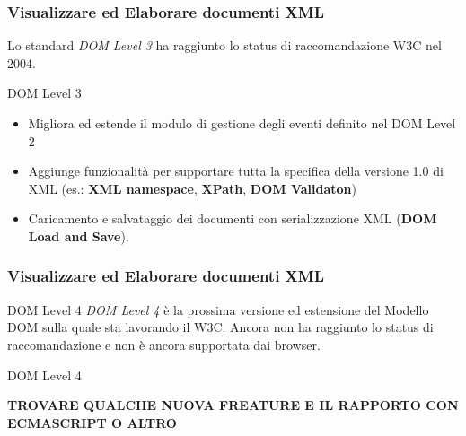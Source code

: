 \begin{frame}
    \frametitle{Visualizzare ed Elaborare documenti XML}
    \addtocounter{nframe}{1}
    

     
      Lo standard \textit{DOM Level 3} ha raggiunto lo status di raccomandazione W3C nel 2004.
     

     \begin{block}{DOM Level 3}
        \begin{itemize}
            \item Migliora ed estende il modulo di gestione degli eventi definito nel DOM Level 2
            \item Aggiunge funzionalità per supportare tutta la specifica della versione 1.0 di XML (es.: \textbf{XML namespace}, \textbf{XPath}, \textbf{DOM Validaton})
            \item Caricamento e salvataggio dei documenti con serializzazione XML (\textbf{DOM Load and Save}).
        \end{itemize}
       
      \end{block}

\end{frame}


\begin{frame}
    \frametitle{Visualizzare ed Elaborare documenti XML}
    \addtocounter{nframe}{1}
    

     \begin{block}{DOM Level 4}
     \textit{DOM Level 4} è la prossima versione ed estensione del Modello DOM sulla quale sta lavorando il W3C. Ancora non ha raggiunto lo status di raccomandazione e non è ancora supportata dai browser. 
     \end{block}
     

     \begin{block}{DOM Level 4}
       
        \textbf{TROVARE QUALCHE NUOVA FREATURE E IL RAPPORTO CON ECMASCRIPT O ALTRO}
       
      \end{block}

\end{frame}

